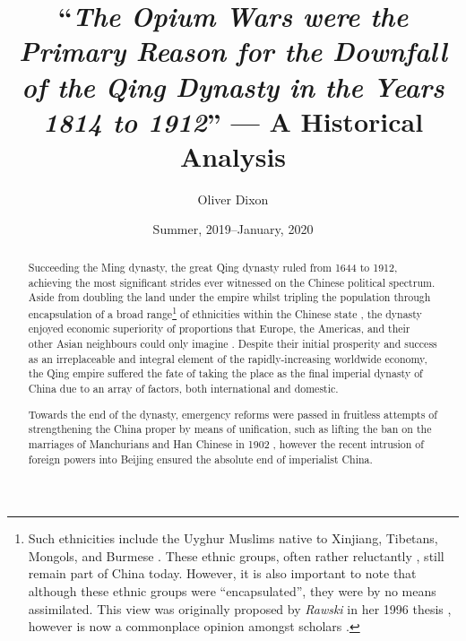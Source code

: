 \documentclass[a4paper,oneside]{article}
\title{``\emph{The Opium Wars were the Primary Reason for the Downfall of the
        Qing Dynasty in the Years 1814 to 1912}'' --- A Historical Analysis}
\author{Oliver Dixon}
\date{Summer, 2019--January, 2020}
\begin{document}
\clearpage\maketitle
\thispagestyle{titlehdr}
\pagestyle{stdhdr}

\vspace*{-1.5em}
\begin{figure}[h!]
	\centering
        \def\svgwidth{0.5\linewidth}
	
\end{figure}
\vspace*{-0.5em}

\begin{abstract}
        Succeeding the Ming dynasty, the great Qing dynasty ruled from 1644 to
        1912, achieving the most significant strides ever witnessed on the
        Chinese political spectrum. Aside from doubling the land under the
        empire \autocites{Turchin:2006}{Goldstone:1995} whilst tripling the
        population through encapsulation of a broad range\footnote{Such
        ethnicities include the Uyghur Muslims native to Xinjiang, Tibetans,
        Mongols, and Burmese \autocite{Chia:1993}. These ethnic groups, often
        rather reluctantly \autocites{Teichman:2002}{Smith:2009}{Dwyer:2005},
        still remain part of China today. However, it is also important to note
        that although these ethnic groups were ``encapsulated'', they were by no
        means assimilated.  This view was originally proposed by \textit{Rawski}
        in her 1996 thesis \autocite{Rawski:1996}, however is now a commonplace
        opinion amongst scholars \autocite{Hou:2014}.} of ethnicities within the
        Chinese state \autocite{Rowe:2012}, the dynasty enjoyed economic
        superiority of proportions that Europe, the Americas, and their other
        Asian neighbours could only imagine \autocite{Maddison:2007}. Despite
        their initial prosperity and success as an irreplaceable and integral
        element of the rapidly-increasing worldwide economy, the Qing empire
        suffered the fate of taking the place as the final imperial dynasty of
        China due to an array of factors, both international and domestic.

        Towards the end of the dynasty, emergency reforms were passed in
        fruitless attempts of strengthening the China proper by means of
        unification, such as lifting the ban on the marriages of Manchurians and
        Han Chinese in 1902 \autocite{Rhoads:2000}, however the recent intrusion
        of foreign powers into Beijing ensured the absolute end of imperialist
        China.


\end{abstract}
\end{document}
